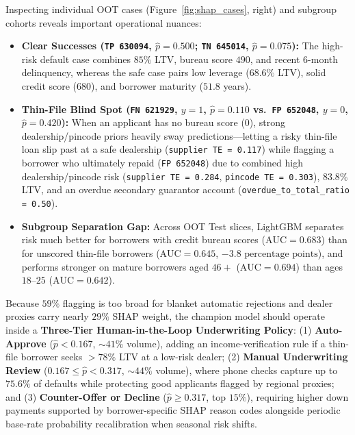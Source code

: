 Inspecting individual OOT cases (Figure~\ref{fig:shap_cases}, right) and subgroup cohorts reveals important operational nuances:
\begin{itemize}
  \item \textbf{Clear Successes (\texttt{TP 630094}, $\hat{p}=0.500$; \texttt{TN 645014}, $\hat{p}=0.075$):} The high-risk default case combines $85\%$ LTV, bureau score $490$, and recent 6-month delinquency, whereas the safe case pairs low leverage ($68.6\%$ LTV), solid credit score ($680$), and borrower maturity ($51.8$ years).
  \item \textbf{Thin-File Blind Spot (\texttt{FN 621929}, $y=1$, $\hat{p}=0.110$ vs.\ \texttt{FP 652048}, $y=0$, $\hat{p}=0.420$):} When an applicant has no bureau score ($0$), strong dealership/pincode priors heavily sway predictions---letting a risky thin-file loan slip past at a safe dealership (\texttt{supplier TE = 0.117}) while flagging a borrower who ultimately repaid (\texttt{FP 652048}) due to combined high dealership/pincode risk (\texttt{supplier TE = 0.284}, \texttt{pincode TE = 0.303}), $83.8\%$ LTV, and an overdue secondary guarantor account (\texttt{overdue\_to\_total\_ratio = 0.50}).
  \item \textbf{Subgroup Separation Gap:} Across OOT Test slices, LightGBM separates risk much better for borrowers with credit bureau scores ($\text{AUC} = 0.683$) than for unscored thin-file borrowers ($\text{AUC} = 0.645$, $-3.8\text{ percentage points}$), and performs stronger on mature borrowers aged $46+$ ($\text{AUC} = 0.694$) than ages $18\text{--}25$ ($\text{AUC} = 0.642$).
\end{itemize}

Because $59\%$ flagging is too broad for blanket automatic rejections and dealer proxies carry nearly $29\%$ SHAP weight, the champion model should operate inside a \textbf{Three-Tier Human-in-the-Loop Underwriting Policy}: (1) \textbf{Auto-Approve} ($\hat{p} < 0.167$, $\sim 41\%$ volume), adding an income-verification rule if a thin-file borrower seeks $>78\%$ LTV at a low-risk dealer; (2) \textbf{Manual Underwriting Review} ($0.167 \le \hat{p} < 0.317$, $\sim 44\%$ volume), where phone checks capture up to $75.6\%$ of defaults while protecting good applicants flagged by regional proxies; and (3) \textbf{Counter-Offer or Decline} ($\hat{p} \ge 0.317$, top $15\%$), requiring higher down payments supported by borrower-specific SHAP reason codes alongside periodic base-rate probability recalibration when seasonal risk shifts.
